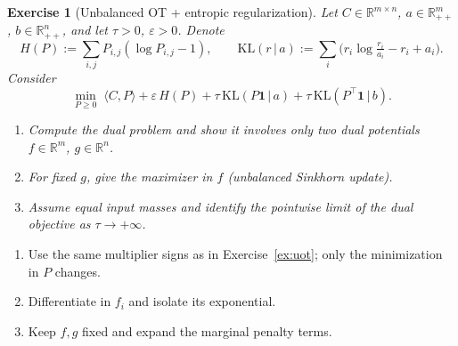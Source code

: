 \documentclass[11pt,a4paper]{article}
\theoremstyle{exostyle}
\newtheorem{exercise}{Exercise}
\newcommand{\R}{\mathbb{R}}
\begin{document}
\begin{exercise}[Unbalanced OT + entropic regularization]\label{ex:uot-entropic-short}
Let $C\in\mathbb R^{m\times n}$, $a\in\mathbb R_{++}^m$, $b\in\mathbb R_{++}^n$, and let $\tau>0$, $\varepsilon>0$. Denote
\[
H(P) := \sum_{i,j} P_{i,j}(\log P_{i,j}-1),\qquad
\mathrm{KL}(r\,|\,a) := \sum_i \bigl(r_i \log \tfrac{r_i}{a_i} - r_i + a_i\bigr).
\]
Consider
\[
\min_{P\ge 0}\;
\langle C,P\rangle
+ \varepsilon\,H(P)
+ \tau\,\mathrm{KL}(P\mathbf 1 \,|\, a)
+ \tau\,\mathrm{KL}(P^\top \mathbf 1 \,|\, b).
\]
\begin{enumerate}[label=\textbf{(\arabic*)}]
  \item Compute the dual problem and show it involves only two dual potentials $f\in\R^m$, $g\in\R^n$.
  \item For fixed $g$, give the maximizer in $f$ (unbalanced Sinkhorn update).
  \item Assume equal input masses and identify the pointwise limit of the dual objective as $\tau\to+\infty$.
\end{enumerate}
\end{exercise}
\begin{hints}
\begin{enumerate}[label=(\arabic*)]\item Use the same multiplier signs as in Exercise~\ref{ex:uot}; only the minimization in $P$ changes.\item Differentiate in $f_i$ and isolate its exponential.\item Keep $f,g$ fixed and expand the marginal penalty terms.\end{enumerate}
\end{hints}
\end{document}
